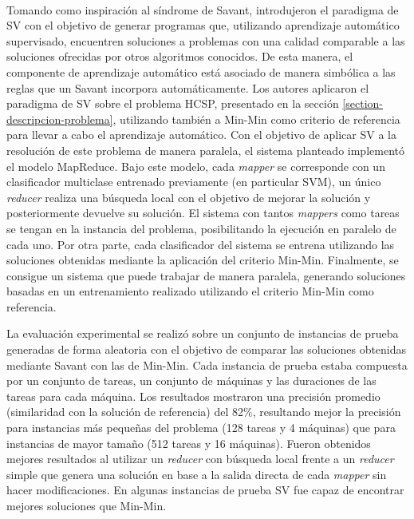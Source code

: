 \paragraph{}Tomando como inspiración al síndrome de Savant, \citet{savant-original} introdujeron el paradigma de SV con el objetivo de generar programas que, utilizando aprendizaje automático supervisado, encuentren soluciones a problemas con una calidad comparable a las soluciones ofrecidas por otros algoritmos conocidos. De esta manera, el componente de aprendizaje automático está asociado de manera simbólica a las reglas que un Savant incorpora automáticamente.
Los autores aplicaron el paradigma de SV sobre el problema HCSP, presentado en la sección \ref{section-descripcion-problema}, utilizando también a Min-Min como criterio de referencia para llevar a cabo el aprendizaje automático.
Con el objetivo de aplicar SV a la resolución de este problema de manera paralela, el sistema planteado implementó el modelo MapReduce. Bajo este modelo, cada \textit{mapper} se corresponde con un clasificador multiclase entrenado previamente (en particular SVM), un único \textit{reducer} realiza una búsqueda local con el objetivo de mejorar la solución y posteriormente devuelve su solución. El sistema con tantos \textit{mappers} como tareas se tengan en la instancia del problema, posibilitando la ejecución en paralelo de cada uno. Por otra parte, cada clasificador del sistema se entrena utilizando las soluciones obtenidas mediante la aplicación del criterio Min-Min. Finalmente, se consigue un sistema que puede trabajar de manera paralela, generando soluciones basadas en un entrenamiento realizado utilizando el criterio Min-Min como referencia. 

La evaluación experimental se realizó sobre un conjunto de instancias de prueba generadas de forma aleatoria con el objetivo de comparar las soluciones obtenidas mediante Savant con las de Min-Min. Cada instancia de prueba estaba compuesta por un conjunto de tareas, un conjunto de máquinas y las duraciones de las tareas para cada máquina. 
Los resultados mostraron una precisión promedio (similaridad con la solución de referencia) del 82\%, resultando mejor la precisión para instancias más pequeñas del problema (128 tareas y 4 máquinas) que para instancias de mayor tamaño (512 tareas y 16 máquinas). 
Fueron obtenidos mejores resultados al utilizar un \textit{reducer} con búsqueda local frente a un \textit{reducer} simple que genera una solución en base a la salida directa de cada \textit{mapper} sin hacer modificaciones. En algunas instancias de prueba SV fue capaz de encontrar mejores soluciones que Min-Min. 

